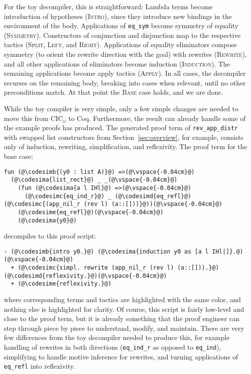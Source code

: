 For the toy decompiler, this is straightforward: Lambda terms become introduction of hypotheses (\textsc{Intro}), since they introduce new bindings
in the environment of the body. Applications of \lstinline{eq_sym} become symmetry of equality (\textsc{Symmetry}).
Constructors of conjunction and disjunction map to the respective tactics (\textsc{Split}, \textsc{Left}, and \textsc{Right}).
Applications of equality eliminators compose symmetry (to orient the rewrite direction with the goal) with rewrites (\textsc{Rewrite}),
and all other applications of eliminators become induction (\textsc{Induction}).
The remaining applications become apply tactics (\textsc{Apply}).
In all cases, the decompiler recurses on the remaining body, breaking into cases when relevant, until no other preconditions match.
At that point the \textsc{Base} case holds, and we are done.

While the toy compiler is very simple, only a few simple changes are needed
to move this from CIC$_{\omega}$ to Coq.
Furthermore, the result can already handle some of the example proofs \toolname has produced.
The generated proof term of \lstinline{rev_app_distr} with swapped list constructors from Section~\ref{sec:overview},
for example, consists only of induction, rewriting, simplification, and reflexivity.
The proof term for the base case:

\begin{lstlisting}
fun (@\codesimb{(y0 : list A)}@) =>(@\vspace{-0.04cm}@)
  (@\codesima{list_rect}@) _ _(@\vspace{-0.04cm}@)
    (fun (@\codesima{a l IHl}@) =>(@\vspace{-0.04cm}@)
      (@\codesimc{eq_ind_r}@) _ (@\codesimd{eq_refl}@) (@\codesimc{(app_nil_r (rev l) (a::[]))}@))(@\vspace{-0.04cm}@)
    (@\codesime{eq_refl}@)(@\vspace{-0.04cm}@)
    (@\codesima{y0}@)
\end{lstlisting}
decompiles to this proof script:

\begin{lstlisting}
- (@\codesimb{intro y0.}@) (@\codesima{induction y0 as [a l IHl|]}.@)(@\vspace{-0.04cm}@)
  + (@\codesimc{simpl. rewrite (app_nil_r (rev l) (a::[])).}@) (@\codesimd{reflexivity.}@)(@\vspace{-0.04cm}@)
  + (@\codesime{reflexivity.}@)
\end{lstlisting}
where corresponding terms and tactics are highlighted with the same color, and nothing else is highlighted for clarity.
Of course, this script is fairly low-level and close to the proof term, but it is already something that the proof engineer
can step through piece by piece to understand, modify, and maintain.
There are very few differences from the toy decompiler needed to produce this,
for example handling of rewrites in both directions (\lstinline{eq_ind_r} as opposed to \lstinline{eq_ind}),
simplifying to handle motive inference for rewrites,
and turning applications of \lstinline{eq_refl} into reflexivity.

